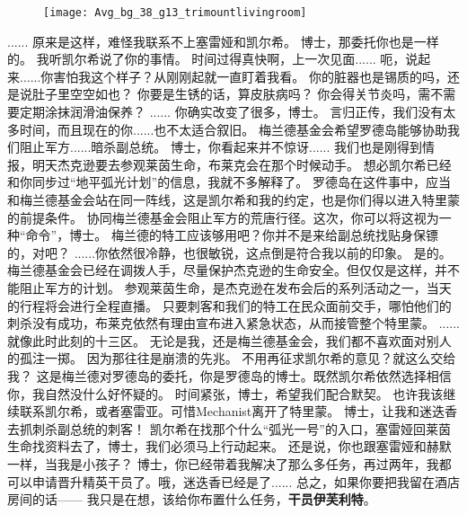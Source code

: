 \documentclass[openany]{book}
\begin{document}
\begin{figure}[h]
    \centering
    \texttt{[image: Avg\_bg\_38\_g13\_trimountlivingroom]}
\end{figure}
\begin{dialogue}
     ......
     原来是这样，难怪我联系不上塞雷娅和凯尔希。
     博士，那委托你也是一样的。
     我听凯尔希说了你的事情。
     时间过得真快啊，上一次见面......
     呃，说起来......你害怕我这个样子？从刚刚起就一直盯着我看。
     你的脏器也是锡质的吗，还是说肚子里空空如也？
     你要是生锈的话，算皮肤病吗？
     你会得关节炎吗，需不需要定期涂抹润滑油保养？
     ......
     你确实改变了很多，博士。
     言归正传，我们没有太多时间，而且现在的你......也不太适合叙旧。
     梅兰德基金会希望罗德岛能够协助我们阻止军方......暗杀副总统。
     博士，你看起来并不惊讶......
     我们也是刚得到情报，明天杰克逊要去参观莱茵生命，布莱克会在那个时候动手。
     想必凯尔希已经和你同步过“地平弧光计划”的信息，我就不多解释了。
     罗德岛在这件事中，应当和梅兰德基金会站在同一阵线，这是凯尔希和我的约定，也是你们得以进入特里蒙的前提条件。
     协同梅兰德基金会阻止军方的荒唐行径。这次，你可以将这视为一种“命令”，博士。
     梅兰德的特工应该够用吧？你并不是来给副总统找贴身保镖的，对吧？
     ......你依然很冷静，也很敏锐，这点倒是符合我以前的印象。
     是的。梅兰德基金会已经在调拨人手，尽量保护杰克逊的生命安全。但仅仅是这样，并不能阻止军方的计划。
     参观莱茵生命，是杰克逊在发布会后的系列活动之一，当天的行程将会进行全程直播。
     只要刺客和我们的特工在民众面前交手，哪怕他们的刺杀没有成功，布莱克依然有理由宣布进入紧急状态，从而接管整个特里蒙。
     ......就像此时此刻的十三区。
     无论是我，还是梅兰德基金会，我们都不喜欢面对别人的孤注一掷。
     因为那往往是崩溃的先兆。
     不用再征求凯尔希的意见？就这么交给我？
     这是梅兰德对罗德岛的委托，你是罗德岛的博士。既然凯尔希依然选择相信你，我自然没什么好怀疑的。
     时间紧张，博士，希望我们配合默契。
     也许我该继续联系凯尔希，或者塞雷亚。可惜Mechanist离开了特里蒙。
     博士，让我和迷迭香去抓刺杀副总统的刺客！
     凯尔希在找那个什么“弧光一号”的入口，塞雷娅回莱茵生命找资料去了，博士，我们必须马上行动起来。
     还是说，你也跟塞雷娅和赫默一样，当我是小孩子？
     博士，你已经带着我解决了那么多任务，再过两年，我都可以申请晋升精英干员了。哦，迷迭香已经是了......
     总之，如果你要把我留在酒店房间的话——
     我只是在想，该给你布置什么任务，\textbf{干员伊芙利特}。
\end{dialogue}
\end{document}

